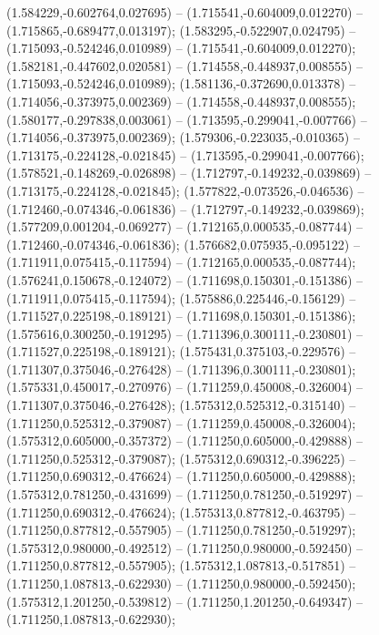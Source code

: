  (1.584229,-0.602764,0.027695) -- (1.715541,-0.604009,0.012270) -- (1.715865,-0.689477,0.013197);
 (1.583295,-0.522907,0.024795) -- (1.715093,-0.524246,0.010989) -- (1.715541,-0.604009,0.012270);
 (1.582181,-0.447602,0.020581) -- (1.714558,-0.448937,0.008555) -- (1.715093,-0.524246,0.010989);
 (1.581136,-0.372690,0.013378) -- (1.714056,-0.373975,0.002369) -- (1.714558,-0.448937,0.008555);
 (1.580177,-0.297838,0.003061) -- (1.713595,-0.299041,-0.007766) -- (1.714056,-0.373975,0.002369);
 (1.579306,-0.223035,-0.010365) -- (1.713175,-0.224128,-0.021845) -- (1.713595,-0.299041,-0.007766);
 (1.578521,-0.148269,-0.026898) -- (1.712797,-0.149232,-0.039869) -- (1.713175,-0.224128,-0.021845);
 (1.577822,-0.073526,-0.046536) -- (1.712460,-0.074346,-0.061836) -- (1.712797,-0.149232,-0.039869);
 (1.577209,0.001204,-0.069277) -- (1.712165,0.000535,-0.087744) -- (1.712460,-0.074346,-0.061836);
 (1.576682,0.075935,-0.095122) -- (1.711911,0.075415,-0.117594) -- (1.712165,0.000535,-0.087744);
 (1.576241,0.150678,-0.124072) -- (1.711698,0.150301,-0.151386) -- (1.711911,0.075415,-0.117594);
 (1.575886,0.225446,-0.156129) -- (1.711527,0.225198,-0.189121) -- (1.711698,0.150301,-0.151386);
 (1.575616,0.300250,-0.191295) -- (1.711396,0.300111,-0.230801) -- (1.711527,0.225198,-0.189121);
 (1.575431,0.375103,-0.229576) -- (1.711307,0.375046,-0.276428) -- (1.711396,0.300111,-0.230801);
 (1.575331,0.450017,-0.270976) -- (1.711259,0.450008,-0.326004) -- (1.711307,0.375046,-0.276428);
 (1.575312,0.525312,-0.315140) -- (1.711250,0.525312,-0.379087) -- (1.711259,0.450008,-0.326004);
 (1.575312,0.605000,-0.357372) -- (1.711250,0.605000,-0.429888) -- (1.711250,0.525312,-0.379087);
 (1.575312,0.690312,-0.396225) -- (1.711250,0.690312,-0.476624) -- (1.711250,0.605000,-0.429888);
 (1.575312,0.781250,-0.431699) -- (1.711250,0.781250,-0.519297) -- (1.711250,0.690312,-0.476624);
 (1.575313,0.877812,-0.463795) -- (1.711250,0.877812,-0.557905) -- (1.711250,0.781250,-0.519297);
 (1.575312,0.980000,-0.492512) -- (1.711250,0.980000,-0.592450) -- (1.711250,0.877812,-0.557905);
 (1.575312,1.087813,-0.517851) -- (1.711250,1.087813,-0.622930) -- (1.711250,0.980000,-0.592450);
 (1.575312,1.201250,-0.539812) -- (1.711250,1.201250,-0.649347) -- (1.711250,1.087813,-0.622930);
